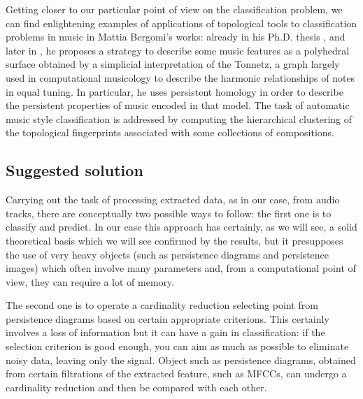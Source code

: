 \documentclass[english, LaM, oneside, noexaminfo]{sapthesis}
\begin{document}
Getting closer to our particular point of view on the classification problem, we can find enlightening examples of applications of topological tools to classification problems in music in Mattia Bergomi’s works: already in his Ph.D. thesis \cite{bergomi2015dynamical}, and later in \cite{bergomi2016towards}, he proposes a strategy to describe some music features as a polyhedral surface obtained by a simplicial interpretation of the Tonnetz, a graph largely used in computational musicology to describe the harmonic relationships of notes in equal tuning. In particular, he uses persistent homology in order to describe the persistent properties of music encoded in that model. The task of automatic music style classification is addressed by computing the hierarchical clustering of the topological fingerprints associated with some collections of compositions.


\subsection{Suggested solution}

Carrying out the task of processing extracted data, as in our case, from audio tracks, there are conceptually two possible ways to follow: the first one is to classify and predict. In our case this approach has certainly, as we will see, a solid theoretical basis which we will see confirmed by the results, but it presupposes the use of very heavy objects (such as persistence diagrams and persistence images) which often involve many parameters and, from a computational point of view, they can require a lot of memory. 

The second one is to operate a cardinality reduction selecting point from persistence diagrams based on certain appropriate criterions. This certainly involves a loss of information but it can have a gain in classification: if the selection criterion is good enough, you can aim as much as possible to eliminate noisy data, leaving only the signal. Object such as persistence diagrams, obtained from certain filtrations of the extracted feature, such as MFCCs, can undergo a cardinality reduction and then be compared with each other.



\end{document}
